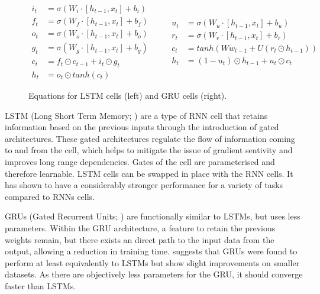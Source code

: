 \documentclass[12pt,twoside]{report}
\begin{document}
\begin{figure}[!ht]
\begin{equation}
  \begin{split}
    i_t &= \sigma(W_i \cdot [h_{t-1},x_t] + b_i) \\
    f_t &= \sigma(W_f \cdot [h_{t-1},x_t] + b_f) \\
		o_t &= \sigma(W_o \cdot [h_{t-1},x_t] + b_o) \\
		g_t &= \sigma(W_g \cdot [h_{t-1},x_t] + b_g) \\
		c_t &= f_t \odot c_{t-1} + i_t \odot g_t \\
		h_t &= o_t \odot tanh(c_t) 
  \end{split}
	\quad\quad
  \begin{split}
		u_t &= \sigma(W_u \cdot [h_{t-1},x_t] + b_u) \\
		r_t &= \sigma(W_r \cdot [h_{t-1},x_t] + b_r) \\
		c_t &= tanh(Ww_{t-1}+U(r_t \odot h_{t-1})) \\
		h_t &= (1-u_{t})\odot h_{t-1} + u_t \odot c_t
  \end{split}
\end{equation}
\caption{Equations for LSTM cells (left) and GRU cells (right).}
\end{figure}
 
LSTM (Long Short Term Memory; \cite{hochreiter_long_1997}) are a type of RNN cell that retains information based on the previous inputs through the introduction of gated architectures. These gated architectures regulate the flow of information coming to and from the cell, which helps to mitigate the issue of gradient sentivity and improves long range dependencies. Gates of the cell are parameterised and therefore learnable. LSTM cells can be swapped in place with the RNN cells. It has shown to have a considerably stronger performance for a variety of tasks compared to RNNs cells.

GRUs (Gated Recurrent Units; \cite{cho_properties_2014}) are functionally similar to LSTMs, but uses less parameters. Within the GRU architecture, a feature to retain the previous weights remain, but there exists an direct path to the input data from the output, allowing a reduction in training time. \cite{chung_empirical_2014} suggests that GRUs were found to perform at least equivalently to LSTMs but show slight improvements on smaller datasets. As there are objectively less parameters for the GRU, it should converge faster than LSTMs.
\end{document}
